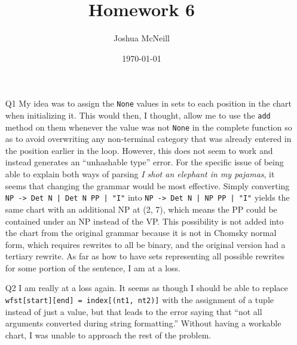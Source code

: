 \documentclass{article}
\title{Homework 6}
\author{Joshua McNeill}
\date{\today}
\newcommand{\sent}[1]{\textit{#1}}
\begin{document}
  \maketitle
  \begin{enumerate}
    \item[Q1] My idea was to assign the \texttt{None} values in sets to each position in the chart when initializing it.
    This would then, I thought, allow me to use the \texttt{add} method on them whenever the value was not \texttt{None} in the complete function so as to avoid overwriting any non-terminal category that was already entered in the position earlier in the loop.
    However, this does not seem to work and instead generates an ``unhashable type'' error.
    For the specific issue of being able to explain both ways of parsing \sent{I shot an elephant in my pajamas}, it seems that changing the grammar would be most effective.
    Simply converting \texttt{NP -> Det N | Det N PP | "I"} into \texttt{NP -> Det N | NP PP | "I"} yields the same chart with an additional NP at (2, 7), which means the PP could be contained under an NP instead of the VP.
    This possibility is not added into the chart from the original grammar because it is not in Chomsky normal form, which requires rewrites to all be binary, and the original version had a tertiary rewrite.
    As far as how to have sets representing all possible rewrites for some portion of the sentence, I am at a loss.
    \item[Q2] I am really at a loss again.
    It seems as though I should be able to replace \texttt{wfst[start][end] = index[(nt1, nt2)]} with the assignment of a tuple instead of just a value, but that leads to the error saying that ``not all arguments converted during string formatting.''
    Without having a workable chart, I was unable to approach the rest of the problem.
  \end{enumerate}
\end{document}
